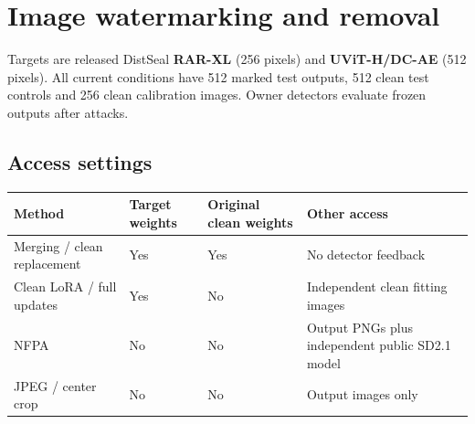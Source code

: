 \section{Image watermarking and
removal}\label{record-docs-watermarking-images-md-image-watermarking-and-removal}

Targets are released DistSeal \textbf{RAR-XL} (256 pixels) and
\textbf{UViT-H/DC-AE} (512 pixels). All current conditions have 512
marked test outputs, 512 clean test controls and 256 clean calibration
images. Owner detectors evaluate frozen outputs after attacks.

\subsection{Access
settings}\label{record-docs-watermarking-images-md-access-settings}

{\scriptsize\setlength{\tabcolsep}{3pt} %
\begin{longtable}[]{@{}
  >{\raggedright\arraybackslash}p{}
  >{\raggedright\arraybackslash}p{}
  >{\raggedright\arraybackslash}p{}
  >{\raggedright\arraybackslash}p{}@{}}
\toprule\noalign{}
\begin{minipage}[b]{\linewidth}\raggedright
Method
\end{minipage} & \begin{minipage}[b]{\linewidth}\raggedright
Target weights
\end{minipage} & \begin{minipage}[b]{\linewidth}\raggedright
Original clean weights
\end{minipage} & \begin{minipage}[b]{\linewidth}\raggedright
Other access
\end{minipage} \\
\midrule\noalign{}
\endhead
\bottomrule\noalign{}
\endlastfoot
Merging / clean replacement & Yes & Yes & No detector feedback \\
Clean LoRA / full updates & Yes & No & Independent clean fitting
images \\
NFPA & No & No & Output PNGs plus independent public SD2.1 model \\
JPEG / center crop & No & No & Output images only \\
\end{longtable}
}

